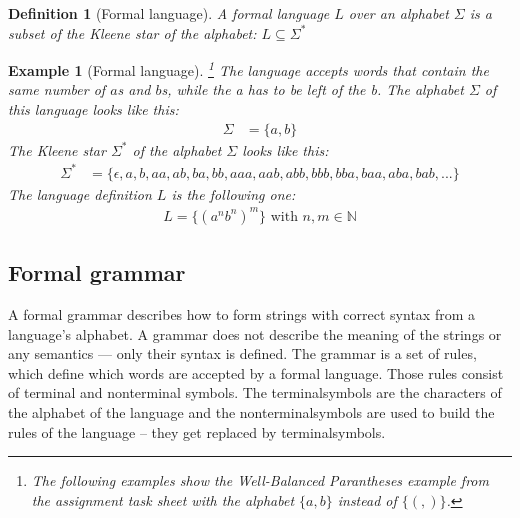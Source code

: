 \documentclass[a4paper, 11pt]{article}
\newtheorem*{example*}{Example}
\newtheorem*{definition*}{Definition}
\begin{document}
\begin{definition*}[Formal language]
A formal language $L$ over an alphabet $\Sigma$ is a subset of the Kleene star of the alphabet: $L \subseteq \Sigma^*$
\end{definition*}


\begin{example*}[Formal language]\footnote{The following examples show the \textit{Well-Balanced Parantheses} example from the assignment task sheet with the alphabet $\{a, b\}$ instead of $\{(, )\}$. } The language accepts words that contain the same number of $a$s and $b$s, while the a has to be left of the b. 
The alphabet $\Sigma$ of this language looks like this:
\begin{align*}
\Sigma & = \{ a, b\}
\end{align*}
The Kleene star $\Sigma^*$ of the alphabet $\Sigma$ looks like this:
\begin{align*}
\Sigma^* & = \{ \epsilon, a, b, aa, ab, ba, bb, aaa, aab, abb, bbb, bba, baa, aba, bab, ...   \}
\end{align*}
The language definition $L$ is the following one:
\begin{align*}
L = \{ (a^{n}b^{n})^m \} \text{ with } n, m \in \mathbb{N}
\end{align*}

\end{example*}




\subsection{Formal grammar}
\label{formalgrammar}


A formal grammar describes how to form strings with correct syntax from a language's alphabet. A grammar does not describe the meaning of the strings or any semantics — only their syntax is defined. The grammar is a set of rules, which define which words are accepted by a formal language. Those rules consist of terminal and nonterminal symbols. The terminalsymbols are the characters of the alphabet of the language and the nonterminalsymbols are used to build the rules of the language -- they get replaced by terminalsymbols. \cite{CNF, language} 
\end{document}
